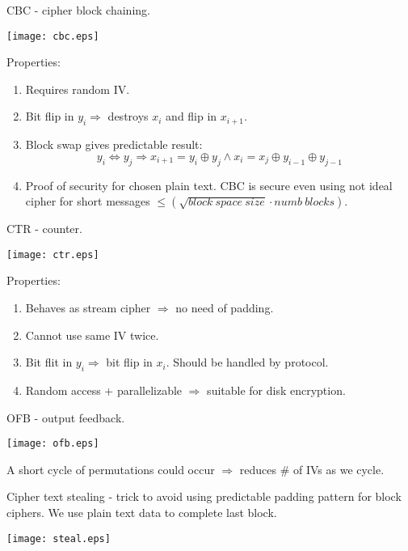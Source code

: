 \begin{definition}
	CBC - cipher block chaining.

	\texttt{[image: cbc.eps]}

	Properties:
\begin{enumerate}
	\item Requires random IV.
	\item Bit flip in $y_i \Rightarrow$ destroys $x_i$ and flip in $x_{i + 1}$.
	\item Block swap gives predictable result:
		\[ y_i \iff y_j \Rightarrow x_{i + 1} = y_i \oplus y_j \land x_i = x_j \oplus y_{i-1} \oplus y_{j - 1} \]
	\item Proof of security for chosen plain text.
		CBC is secure even using not ideal cipher for short messages $\leq (\sqrt{block\ space\ size} \cdot numb\ blocks)$.
\end{enumerate}

\end{definition}
\begin{definition}
	CTR - counter.

	\texttt{[image: ctr.eps]}

	Properties:
\begin{enumerate}
	\item Behaves as stream cipher $\Rightarrow$ no need of padding.
	\item Cannot use same IV twice.
	\item Bit flit in $y_i \Rightarrow$ bit flip in $x_i$.
		Should be handled by protocol.
	\item Random access + parallelizable $\Rightarrow$ suitable for disk encryption.
\end{enumerate}
\end{definition}

\begin{definition}
	OFB - output feedback.

	\texttt{[image: ofb.eps]}

	A short cycle of permutations could occur $\Rightarrow$ reduces \# of IVs as we cycle.
\end{definition}

\begin{definition}
	Cipher text stealing - trick to avoid using predictable padding pattern for block ciphers. We use plain text data to complete last block.

	\texttt{[image: steal.eps]}
\end{definition}

